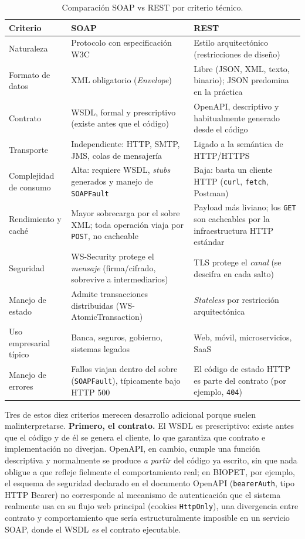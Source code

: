 \begin{table}[H]
  \centering
  \small
  \caption{Comparaci\'on SOAP vs REST por criterio t\'ecnico.}
  \label{tab:soap-vs-rest}
  \begin{tabular}{@{}p{2.6cm}p{6.2cm}p{6.2cm}@{}}
    \toprule
    Criterio & SOAP & REST \\
    \midrule
    Naturaleza & Protocolo con especificaci\'on W3C & Estilo arquitect\'onico (restricciones de dise\~no) \\
    Formato de datos & XML obligatorio (\emph{Envelope}) & Libre (JSON, XML, texto, binario); JSON predomina en la pr\'actica \\
    Contrato & WSDL, formal y prescriptivo (existe antes que el c\'odigo) & OpenAPI, descriptivo y habitualmente generado desde el c\'odigo \\
    Transporte & Independiente: HTTP, SMTP, JMS, colas de mensajer\'ia & Ligado a la sem\'antica de HTTP/HTTPS \\
    Complejidad de consumo & Alta: requiere WSDL, \emph{stubs} generados y manejo de \texttt{SOAPFault} & Baja: basta un cliente HTTP (\texttt{curl}, \texttt{fetch}, Postman) \\
    Rendimiento y cach\'e & Mayor sobrecarga por el sobre XML; toda operaci\'on viaja por \texttt{POST}, no cacheable & Payload m\'as liviano; los \texttt{GET} son cacheables por la infraestructura HTTP est\'andar \\
    Seguridad & WS-Security protege el \emph{mensaje} (firma/cifrado, sobrevive a intermediarios) & TLS protege el \emph{canal} (se descifra en cada salto) \\
    Manejo de estado & Admite transacciones distribuidas (WS-AtomicTransaction) & \emph{Stateless} por restricci\'on arquitect\'onica \\
    Uso empresarial t\'ipico & Banca, seguros, gobierno, sistemas legados & Web, m\'ovil, microservicios, SaaS \\
    Manejo de errores & Fallos viajan dentro del sobre (\texttt{SOAPFault}), t\'ipicamente bajo HTTP 500 & El c\'odigo de estado HTTP es parte del contrato (por ejemplo, \texttt{404}) \\
    \bottomrule
  \end{tabular}
\end{table}

Tres de estos diez criterios merecen desarrollo adicional porque suelen
malinterpretarse. \textbf{Primero, el contrato.} El WSDL es prescriptivo:
existe antes que el c\'odigo y de \'el se genera el cliente, lo que
garantiza que contrato e implementaci\'on no diverjan. OpenAPI, en cambio,
cumple una funci\'on descriptiva y normalmente se produce \emph{a partir}
del c\'odigo ya escrito, sin que nada obligue a que refleje fielmente el
comportamiento real; en BIOPET, por ejemplo, el esquema de seguridad
declarado en el documento OpenAPI (\texttt{bearerAuth}, tipo HTTP Bearer)
no corresponde al mecanismo de autenticaci\'on que el sistema realmente usa
en su flujo web principal (cookies \texttt{HttpOnly}), una divergencia entre
contrato y comportamiento que ser\'ia estructuralmente imposible en un
servicio SOAP, donde el WSDL \emph{es} el contrato ejecutable.

